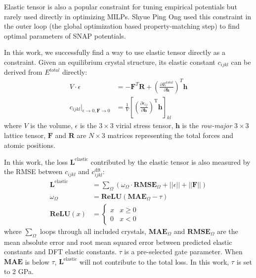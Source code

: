 \documentclass[prb,reprint]{revtex4-2}
\begin{document}
Elastic tensor is also a popular constraint for tuning empirical potentials but 
rarely used directly in optimizing MILPs. Shyue Ping Ong used this constraint in 
the outer loop (the global optimization based property-matching step) to find 
optimal parameters of SNAP potentials. 

In this work, we successfully find a way to use elastic tensor directly as a 
constraint. Given an equilibrium crystal structure, its elastic constant 
$c_{ijkl}$ can be derived from $E^{total}$ directly:
\begin{align}
\label{eq:virial}
V \cdot \epsilon & = -\mathbf{F}^{T}\mathbf{R} + \left(
    \frac{\partial E^{total}}{\partial \mathbf{h}}\right)^T \mathbf{h} \\ 
\label{eq:cijkl}
c_{ijkl} |_{\epsilon \to 0, \mathbf{F} \to 0} & = \frac{1}{V}\left[
    \left( 
        \frac{\partial{\epsilon_{ij}}}{\partial{\mathbf{h}}}
    \right)^{\mathrm{T}}\mathbf{h}
\right]_{kl}
\end{align}
where $V$ is the volume, $\epsilon$ is the $3 \times 3$ virial stress tensor, 
$\mathbf{h}$ is the \textit{row-major} $3 \times 3$ lattice tensor, $\mathbf{F}$ 
and $\mathbf{R}$ are $N \times 3$ matrices representing the total forces and 
atomic positions.

In this work, the loss $\mathbf{L}^{\mathrm{elastic}}$ contributed by the 
elastic tensor is also measured by the RMSE between $c_{ijkl}$ and 
$c_{ijkl}^{\mathrm{dft}}$:
\begin{align}
\label{eq:cijkl_loss}
\mathbf{L}^{\mathrm{elastic}} 
& = \sum_{\Omega}{\left(
    \omega_{\Omega} \cdot \mathbf{RMSE}_{\Omega} 
    + ||\epsilon|| + ||\mathbf{F}||
\right)}
 \\
\label{eq:cijkl_loss_gate}
\omega_{\Omega} & = \mathbf{ReLU}(\mathbf{MAE}_{\Omega} - \tau) \\
\label{eq:relu}
\mathbf{ReLU}(x) & = \begin{cases}
    x & x \ge 0 \\
    0 & x < 0
\end{cases}
\end{align}
where $\sum_{\Omega}$ loops through all included crystals, 
$\mathbf{MAE}_{\Omega}$ and $\mathbf{RMSE}_{\Omega}$ are the mean absolute error 
and root mean squared error between predicted elastic constants and DFT elastic 
constants. $\tau$ is a pre-selected gate parameter. 
When $\mathbf{MAE}$ is below $\tau$, $\mathbf{L}^{\mathrm{elastic}}$ will not 
contribute to the total loss. In this work, $\tau$ is set to 2 GPa.
\end{document}
